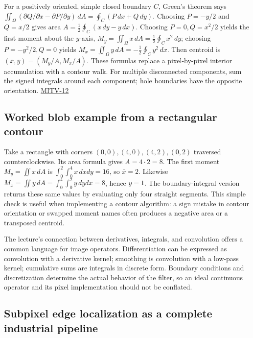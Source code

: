For a positively oriented, simple closed boundary \(C\), Green's theorem says \(\iint_\Omega(\partial Q/\partial x-\partial P/\partial y)\,dA=\oint_C(P\,dx+Q\,dy)\). Choosing \(P=-y/2\) and \(Q=x/2\) gives area \(A=\frac12\oint_C(x\,dy-y\,dx)\). Choosing \(P=0,Q=x^2/2\) yields the first moment about the \(y\)-axis, \(M_y=\iint_\Omega x\,dA=\frac12\oint_Cx^2\,dy\); choosing \(P=-y^2/2,Q=0\) yields \(M_x=\iint_\Omega y\,dA=-\frac12\oint_Cy^2\,dx\). Then centroid is \((\bar{x},\bar{y})=(M_y/A,M_x/A)\). These formulas replace a pixel-by-pixel interior accumulation with a contour walk. For multiple disconnected components, sum the signed integrals around each component; hole boundaries have the opposite orientation. \hyperref[04-visual-computing-ii-ch036-mitv-12---blob-analysis-binary-image-processing-greens-theorem-derivative-and-integral]{MITV-12}

\subsection{Worked blob example from a rectangular contour}\label{04-visual-computing-ii-ch030-worked-blob-example-from-a-rectangular-contour}

Take a rectangle with corners \((0,0),(4,0),(4,2),(0,2)\) traversed counterclockwise. Its area formula gives \(A=4\cdot2=8\). The first moment \(M_y=\iint x\,dA\) is \(\int_0^2\int_0^4x\,dxdy=16\), so \(\bar{x}=2\). Likewise \(M_x=\iint y\,dA=\int_0^4\int_0^2y\,dydx=8\), hence \(\bar{y}=1\). The boundary-integral version returns these same values by evaluating only four straight segments. This simple check is useful when implementing a contour algorithm: a sign mistake in contour orientation or swapped moment names often produces a negative area or a transposed centroid.

The lecture's connection between derivatives, integrals, and convolution offers a common language for image operators. Differentiation can be expressed as convolution with a derivative kernel; smoothing is convolution with a low-pass kernel; cumulative sums are integrals in discrete form. Boundary conditions and discretization determine the actual behavior of the filter, so an ideal continuous operator and its pixel implementation should not be conflated.

\subsection{Subpixel edge localization as a complete industrial pipeline}\label{04-visual-computing-ii-ch030-subpixel-edge-localization-as-a-complete-industrial-pipeline}

